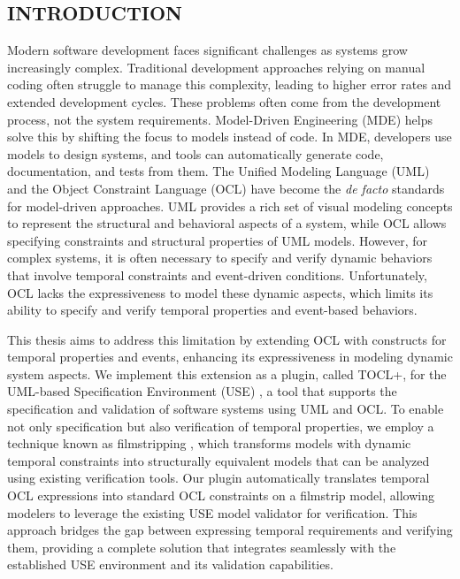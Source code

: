 \setcounter{page}{1}


\setlength{\parindent}{1cm}

\begin{center}
  \section*{INTRODUCTION}
\end{center}

Modern software development faces significant challenges as
systems grow increasingly complex. Traditional development approaches relying on 
manual coding often struggle to manage this complexity, leading to higher error
rates and extended development cycles. These problems often come from the development 
process, not the system requirements. Model-Driven Engineering (MDE) \cite{MDE} helps 
solve this by shifting the focus to models instead of code. In MDE, developers use 
models to design systems, and tools can automatically generate code, documentation, 
and tests from them. The Unified Modeling Language (UML) \cite{UML} and the Object 
Constraint Language (OCL) \cite{OCL} have become the \textit{de facto} standards 
for model-driven approaches. UML provides a rich set of visual modeling concepts to 
represent the structural and behavioral aspects of a system, while OCL allows 
specifying constraints and structural properties of UML models. However, for 
complex systems, it is often necessary to specify and verify dynamic behaviors 
that involve temporal constraints and event-driven conditions. Unfortunately, OCL 
lacks the expressiveness to model these dynamic aspects, which limits its ability 
to specify and verify temporal properties and event-based behaviors.

This thesis aims to address this limitation by extending OCL with constructs for
temporal properties and events, enhancing its expressiveness in modeling dynamic 
system aspects. We implement this extension as a plugin, called TOCL+, for the 
UML-based Specification Environment (USE) \cite{USE}, a tool that supports the 
specification and validation of software systems using UML and OCL. To enable not 
only specification but also verification of temporal properties, we employ a 
technique known as filmstripping \cite{Filmstripping}, which transforms models 
with dynamic temporal constraints into structurally equivalent models that can 
be analyzed using existing verification tools. Our plugin automatically translates 
temporal OCL expressions into standard OCL constraints on a filmstrip model, 
allowing modelers to leverage the existing USE model validator \cite{USE_Validator} 
for verification. This approach bridges the gap between expressing temporal 
requirements and verifying them, providing a complete solution that integrates 
seamlessly with the established USE environment and its validation capabilities.

